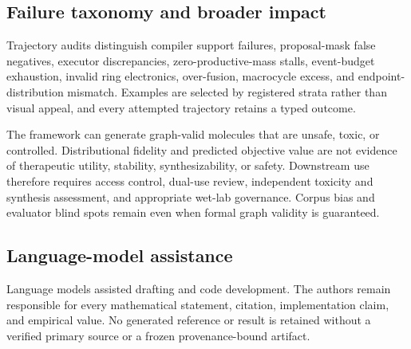 \subsection{Failure taxonomy and broader impact}

Trajectory audits distinguish compiler support failures, proposal-mask false
negatives, executor discrepancies, zero-productive-mass stalls, event-budget
exhaustion, invalid ring electronics, over-fusion, macrocycle excess, and
endpoint-distribution mismatch. Examples are selected by registered strata
rather than visual appeal, and every attempted trajectory retains a typed
outcome.

The framework can generate graph-valid molecules that are unsafe, toxic, or
controlled. Distributional fidelity and predicted objective value are not
evidence of therapeutic utility, stability, synthesizability, or safety.
Downstream use therefore requires access control, dual-use review, independent
toxicity and synthesis assessment, and appropriate wet-lab governance. Corpus
bias and evaluator blind spots remain even when formal graph validity is
guaranteed.

\subsection{Language-model assistance}

Language models assisted drafting and code development. The authors remain
responsible for every mathematical statement, citation, implementation claim,
and empirical value. No generated reference or result is retained without a
verified primary source or a frozen provenance-bound artifact.
